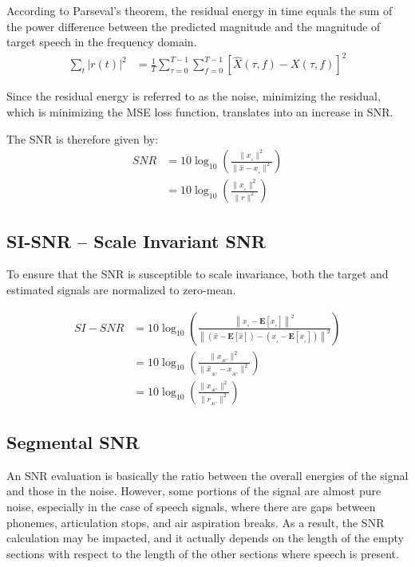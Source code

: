 According to Parseval's theorem, the residual energy in time equals the sum of
the power difference between the predicted magnitude 
and the magnitude of target speech 
in the frequency domain\cite{1643671009}.
\begin{align}
    \sum_{t} |r(t)|^{2} & = \frac{1}{T}\sum_{\tau=0}^{T-1}\sum_{f=0}^{T-1} \left[ \widehat{X}(\tau, f) - X(\tau, f)\right]^{2}
\end{align}

Since the residual energy is referred to as the noise,
minimizing the residual,
which is minimizing the MSE loss function,
translates into an increase in SNR.



The SNR is therefore given by:
\begin{align}\label{eq:snr_equation}
    SNR & = 10\log_{10} \left( \frac{ \| x_{_{s}}\|^{2}}{\|\widehat{x} - x_{_{s}} \|^{2}}  \right) \nonumber \\
    & =  10\log_{10} \left( \frac{ \| x_{_{s}} \|^{2}}{\| r \|^{2}} \right)
\end{align}
\subsection{SI-SNR -- Scale Invariant SNR}
To ensure that the SNR is susceptible to scale invariance\cite{roux2018sdr},
both the target and estimated signals are normalized to zero-mean.

\begin{align}
    SI-SNR & = 10\log_{10} \left( \frac{\left\| x_{_{s}} - \mathbf{E}[x_{_{s}}]\right\|^{2}}
    {\left\| (\widehat{x} - \mathbf{E}[\widehat{x}]) - (x_{_{s}} - \mathbf{E}[x_{_{s}}]) \right\|^{2}} \right) \nonumber \\
    & = 10\log_{10} \left( \frac{ \| x_{_{AC}}\|^{2}}{\|\widehat{x}_{_{AC}} - x_{_{AC}}\|^{2}}  \right) \nonumber \\
    & =  10\log_{10} \left( \frac{ \| x_{_{AC}}\|^{2}}{\| r_{_{AC}} \|^{2}} \right)
\end{align}

\subsection{Segmental SNR}
An SNR evaluation is basically the ratio between the overall 
energies of the signal and those in the noise. 
However, some portions of the signal are almost pure noise, 
especially in the case of speech signals, 
where there are gaps between phonemes, 
articulation stops, and air aspiration breaks. As a result,
the SNR calculation may be impacted, and
it actually depends on
the length of the empty sections with respect 
to the length of
the other sections where speech is present.

